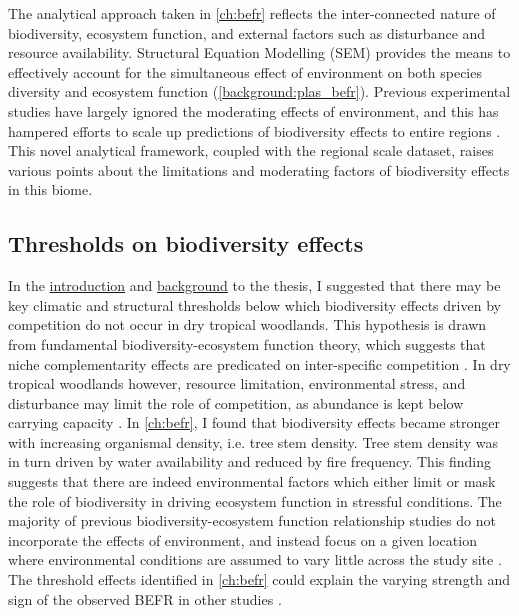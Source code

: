 \begin{refsection}
The analytical approach taken in \autoref{ch:befr} reflects the inter-connected nature of biodiversity, ecosystem function, and external factors such as disturbance and resource availability. Structural Equation Modelling (SEM) provides the means to effectively account for the simultaneous effect of environment on both species diversity and ecosystem function (\autoref{background:plas_befr}). Previous experimental studies have largely ignored the moderating effects of environment, and this has hampered efforts to scale up predictions of biodiversity effects to entire regions \citep{Thompson2021}. This novel analytical framework, coupled with the regional scale dataset, raises various points about the limitations and moderating factors of biodiversity effects in this biome.


\subsection{Thresholds on biodiversity effects}
\label{discussion:ssec:thresholds}

In the \hyperref[ch:intro]{introduction} and \hyperref[ch:background]{background} to the thesis, I suggested that there may be key climatic and structural thresholds below which biodiversity effects driven by competition do not occur in dry tropical woodlands. This hypothesis is drawn from fundamental biodiversity-ecosystem function theory, which suggests that niche complementarity effects are predicated on inter-specific competition \citep{Isbell2013}. In dry tropical woodlands however, resource limitation, environmental stress, and disturbance may limit the role of competition, as abundance is kept below carrying capacity \citep{Sankaran2005}. In \autoref{ch:befr}, I found that biodiversity effects became stronger with increasing organismal density, i.e. tree stem density. Tree stem density was in turn driven by water availability and reduced by fire frequency. This finding suggests that there are indeed environmental factors which either limit or mask the role of biodiversity in driving ecosystem function in stressful conditions. The majority of previous biodiversity-ecosystem function relationship studies do not incorporate the effects of environment, and instead focus on a given location where environmental conditions are assumed to vary little across the study site \citep{Cardinale2009, Plas2019}. The threshold effects identified in \autoref{ch:befr} could explain the varying strength and sign of the observed BEFR in other studies \citep{Liang2016}.


\end{refsection}
